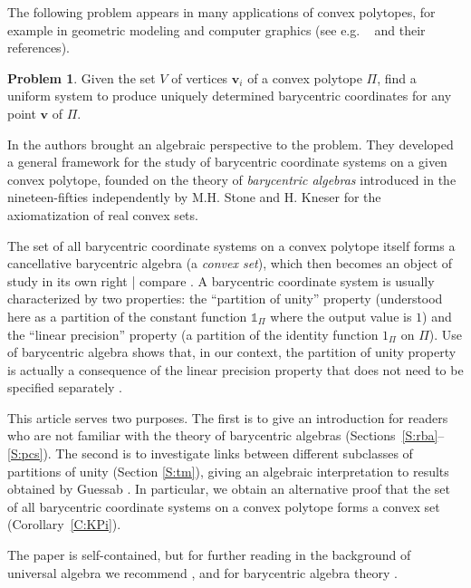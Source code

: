 \documentclass[12pt]{amsart}
\theoremstyle{plain}
\theoremstyle{definition}
\newtheorem{problem}[theorem]{Problem}
\numberwithin{equation}{section}
\begin{document}
The following problem appears in many applications of convex polytopes, for example in geometric modeling and computer graphics (see e.g. ~\cite{FloaterGBCA, FHK} and their references).

\begin{problem}\label{P:problem}
Given the set $V$ of vertices $\mathbf v_i$ of a convex polytope $\Pi$, find a uniform system to produce uniquely determined barycentric coordinates for any point $\mathbf v$ of $\Pi$.
\end{problem}

In \cite{RSZ1, RSZ2} the authors brought an algebraic perspective to the problem. They developed a general framework for the study of barycentric
coordinate systems on a given convex polytope, founded on the theory of \emph{barycentric algebras} introduced in the nineteen-fifties independently by M.H. Stone \cite{Stone} and H. Kneser \cite{Kneser} for the axiomatization of real convex sets.

The set of all barycentric coordinate systems on a convex polytope itself forms a cancellative barycentric algebra (a \emph{convex set}), which then becomes an object of study in its own right | compare \cite[Section 6]{RSZ1}. A barycentric coordinate system is usually characterized by two properties: the ``partition of unity'' property (understood here as a partition of the constant function $\mathds 1_\Pi$ where the output value is $1$) and the ``linear precision'' property (a partition of the identity function $1_\Pi$ on $\Pi$). Use of barycentric algebra shows that, in our context, the partition of unity property is actually a consequence of the linear precision property that does not need to be specified separately \cite[Lemma~2.23, Remark~6.4]{RSZ1}.

This article serves two purposes. The first is to give an introduction for readers who are not familiar with the theory of barycentric algebras (Sections~\ref{S:rba}--\ref{S:pcs}). The second is to investigate links between different subclasses of partitions of unity (Section \ref{S:tm}), giving an algebraic interpretation to results obtained by Guessab \cite{G}. In particular, we obtain an alternative proof that the set of all barycentric coordinate systems on a convex polytope forms a convex set (Corollary~\ref{C:KPi}).

The paper is self-contained, but for further reading in the background of universal algebra we recommend \cite{B, BS}, and for barycentric algebra theory \cite{RS85,Sm11,Modes}.
\end{document}

